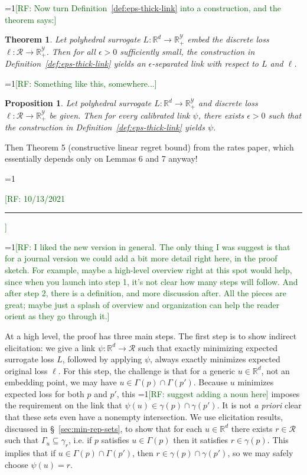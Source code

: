 \documentclass[11pt]{article}
\newcommand{\Comments}{1}
\newcommand{\mynote}[2]{\ifnum\Comments=1\textcolor{#1}{#2}\fi}
\newcommand{\raf}[1]{\mynote{darkgreen}{[RF: #1]}}
\newcommand{\reals}{\mathbb{R}}
\newcommand{\R}{\mathcal{R}}
\newcommand{\Y}{\mathcal{Y}}
\newcommand{\inprod}[2]{\langle #1, #2 \rangle}%
\DeclareMathOperator*{\argmin}{arg\,min}
\newtheorem{theorem}{Theorem}
\newtheorem{proposition}{Proposition}
\begin{document}
\raf{Now turn Definition~\ref{def:eps-thick-link} into a construction, and the theorem says:}

\begin{theorem}
  Let polyhedral surrogate $L:\reals^d \to \reals^\Y_+$ embed the discrete loss $\ell:\R\to\reals^\Y_+$.
  Then for all $\epsilon>0$ sufficiently small, the construction in Definition~\ref{def:eps-thick-link} yields an $\epsilon$-separated link with respect to $L$ and $\ell$.
\end{theorem}

\raf{Something like this, somewhere...}
\begin{proposition}
  Let polyhedral surrogate $L:\reals^d \to \reals^\Y_+$ and discrete loss $\ell:\R\to\reals^\Y_+$ be given.
  Then for every calibrated link $\psi$, there exists $\epsilon>0$ such that the construction in Definition~\ref{def:eps-thick-link} yields $\psi$.
\end{proposition}

Then Theorem 5 (constructive linear regret bound) from the rates paper, which essentially depends only on Lemmas 6 and 7 anyway!

\raf{10/13/2021 \hrule}

\bigskip

\raf{I liked the new version in general.  The only thing I was suggest is that for a journal version we could add a bit more detail right here, in the proof sketch.  For example, maybe a high-level overview right at this spot would help, since when you launch into step 1, it's not clear how many steps will follow.  And after step 2, there is a definition, and more discussion after.  All the pieces are great; maybe just a splash of overview and organization can help the reader orient as they go through it.}

At a high level, the proof has three main steps.
The first step is to show indirect elicitation: we give a link $\psi: \reals^d \to \R$ such that exactly minimizing expected surrogate loss $L$, followed by applying $\psi$, always exactly minimizes expected original loss $\ell$.
For this step, the challenge is that for a generic $u \in \reals^d$, not an embedding point, we may have $u \in \Gamma(p) \cap \Gamma(p')$.
Because $u$ minimizes expected loss for both $p$ and $p'$, this \raf{suggest adding a noun here} imposes the requirement on the link that $\psi(u) \in \gamma(p) \cap \gamma(p')$.
It is not \emph{a priori} clear that these sets even have a nonempty intersection.
We use elicitation results, discussed in \S~\ref{sec:min-rep-sets}, to show that for each $u \in \reals^d$ there exists $r \in \R$ such that $\Gamma_u \subseteq \gamma_r$, i.e. if $p$ satisfies $u \in \Gamma(p)$ then it satisfies $r \in \gamma(p)$.
This implies that if $u \in \Gamma(p) \cap \Gamma(p')$, then $r \in \gamma(p) \cap \gamma(p')$, so we may safely choose $\psi(u) = r$.
\end{document}
